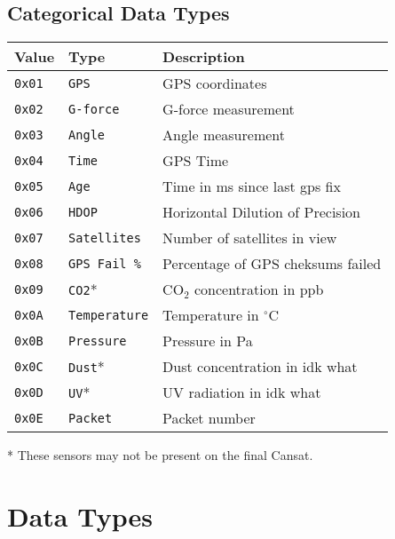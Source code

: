 \documentclass[a4paper]{article}
\begin{document}
\subsection{Categorical Data Types}
\begin{longtable}{@{}lll@{}}
\toprule
Value    & Type             & Description                  \\
\midrule
\texttt{0x01} & \texttt{GPS}        & GPS coordinates                  \\
\texttt{0x02} & \texttt{G-force}    & G-force measurement              \\
\texttt{0x03} & \texttt{Angle}      & Angle measurement                \\
\texttt{0x04} & \texttt{Time}       & GPS Time                         \\
\texttt{0x05} & \texttt{Age}        & Time in ms since last gps fix    \\
\texttt{0x06} & \texttt{HDOP}       & Horizontal Dilution of Precision \\
\texttt{0x07} & \texttt{Satellites} & Number of satellites in view     \\
\texttt{0x08} & \texttt{GPS Fail \%}& Percentage of GPS cheksums failed\\
\texttt{0x09} & \texttt{CO2}*       & CO$_2$ concentration in ppb      \\
\texttt{0x0A} & \texttt{Temperature}& Temperature in $^\circ$C         \\
\texttt{0x0B} & \texttt{Pressure}   & Pressure in Pa                   \\
\texttt{0x0C} & \texttt{Dust}*      & Dust concentration in idk what   \\
\texttt{0x0D} & \texttt{UV}*        & UV radiation in idk what         \\
\texttt{0x0E} & \texttt{Packet}     & Packet number                    \\
\bottomrule
\end{longtable}
* These sensors may not be present on the final Cansat.

\section{Data Types}\label{data-types}
\end{document}
